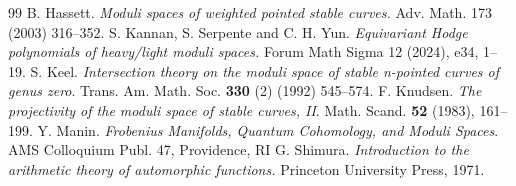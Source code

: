\documentclass[11pt]{amsart}
\numberwithin{equation}{section}
\theoremstyle{definition}
\begin{document}
\begin{thebibliography}{99}
     B. Hassett. {\em Moduli spaces of weighted pointed stable curves.} Adv. Math. 173 (2003) 316–352.
     S. Kannan, S. Serpente and C. H. Yun. {\em Equivariant Hodge polynomials of heavy/light moduli spaces.} Forum Math Sigma 12 (2024), e34, 1--19. 
     S. Keel. {\em Intersection theory on the moduli space of stable n-pointed curves of genus zero}. Trans. Am. Math. Soc. \textbf{330} (2) (1992) 545--574.
	 F. Knudsen. {\em The projectivity of the moduli space of stable curves, II}. Math. Scand. \textbf{52} (1983), 161--199.
     Y. Manin. {\em Frobenius Manifolds, Quantum Cohomology, and Moduli Spaces}. AMS Colloquium Publ. 47, Providence, RI
     G. Shimura. {\em Introduction to the arithmetic theory of automorphic functions.} Princeton University Press, 1971.
\end{thebibliography}
\end{document}
